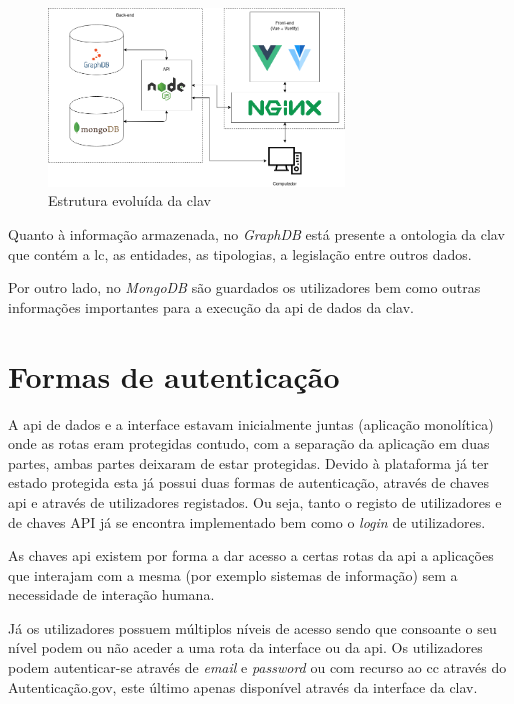 \begin{figure}[H]
    \centering
    \includegraphics[width=0.7\textwidth]{img/clav_struct2.png}
    \caption{Estrutura evoluída da \acrshort{clav}}\label{fig:clav_struct2}
\end{figure}

Quanto à informação armazenada, no \textit{GraphDB} está presente a ontologia da \acrshort{clav} que contém a 
\acrshort{lc}, as entidades, as tipologias, a legislação entre outros dados. 

Por outro lado, no \textit{MongoDB} são guardados os utilizadores bem como outras informações importantes para a 
execução da \acrshort{api} de dados da \acrshort{clav}.

\section{Formas de autenticação}\label{sec:autenticacao}
A \acrshort{api} de dados e a interface estavam inicialmente juntas (aplicação monolítica) onde as rotas eram 
protegidas contudo, com a separação da aplicação em duas partes, ambas partes deixaram de estar protegidas. 
Devido à plataforma já ter estado protegida esta já possui duas formas de autenticação, através de chaves 
\acrshort{api} e através de utilizadores registados. Ou seja, tanto o registo de utilizadores e de chaves API já se 
encontra implementado bem como o \textit{login} de utilizadores.

As chaves \acrshort{api} existem por forma a dar acesso a certas rotas da \acrshort{api} a aplicações que 
interajam com a mesma (por exemplo sistemas de informação) sem a necessidade de interação humana.

Já os utilizadores possuem múltiplos níveis de acesso sendo que consoante o seu nível podem ou não aceder a uma 
rota da interface ou da \acrshort{api}. Os utilizadores podem autenticar-se através de \textit{email} e 
\textit{password} ou com recurso ao \acrfull{cc} através do Autenticação.gov, este último apenas disponível através da interface da \acrshort{clav}.

